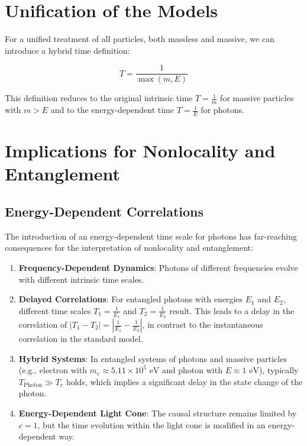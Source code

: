 \documentclass[a4paper,12pt]{article}
\begin{document}
	\section{Unification of the Models}
	For a unified treatment of all particles, both massless and massive, we can introduce a hybrid time definition:
	
	\begin{equation}
		T = \frac{1}{\max(m, E)}
	\end{equation}
	
	This definition reduces to the original intrinsic time $T = \frac{1}{m}$ for massive particles with $m > E$ and to the energy-dependent time $T = \frac{1}{E}$ for photons.
	
	\section{Implications for Nonlocality and Entanglement}
	\subsection{Energy-Dependent Correlations}
	The introduction of an energy-dependent time scale for photons has far-reaching consequences for the interpretation of nonlocality and entanglement:
	
	\begin{enumerate}
		\item \textbf{Frequency-Dependent Dynamics}: Photons of different frequencies evolve with different intrinsic time scales.
		
		\item \textbf{Delayed Correlations}: For entangled photons with energies $E_1$ and $E_2$, different time scales $T_1 = \frac{1}{E_1}$ and $T_2 = \frac{1}{E_2}$ result. This leads to a delay in the correlation of $|T_1 - T_2| = \left|\frac{1}{E_1} - \frac{1}{E_2}\right|$, in contrast to the instantaneous correlation in the standard model.
		
		\item \textbf{Hybrid Systems}: In entangled systems of photons and massive particles (e.g., electron with $m_e \approx 5.11 \times 10^5 \text{ eV}$ and photon with $E \approx 1 \text{ eV}$), typically $T_{\text{Photon}} \gg T_e$ holds, which implies a significant delay in the state change of the photon.
		
		\item \textbf{Energy-Dependent Light Cone}: The causal structure remains limited by $c = 1$, but the time evolution within the light cone is modified in an energy-dependent way.
	\end{enumerate}
	
\end{document}
